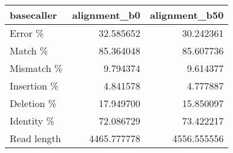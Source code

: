 \begin{tabular}{lrr}
\toprule
basecaller &  alignment\_b0 &  alignment\_b50 \\
\midrule
Error \%     &     32.585652 &      30.242361 \\
Match \%     &     85.364048 &      85.607736 \\
Mismatch \%  &      9.794374 &       9.614377 \\
Insertion \% &      4.841578 &       4.777887 \\
Deletion \%  &     17.949700 &      15.850097 \\
Identity \%  &     72.086729 &      73.422217 \\
Read length &   4465.777778 &    4556.555556 \\
\bottomrule
\end{tabular}
